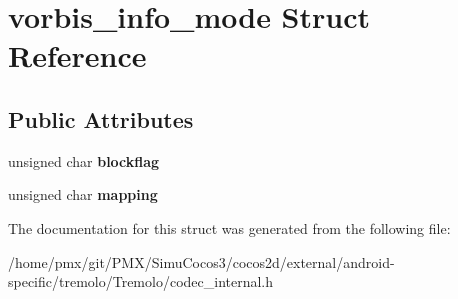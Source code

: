 \hypertarget{structvorbis__info__mode}{}\section{vorbis\+\_\+info\+\_\+mode Struct Reference}
\label{structvorbis__info__mode}
\subsection*{Public Attributes}
\begin{DoxyCompactItemize}
\item 
\mbox{\label{structvorbis__info__mode_a83d0bf9b2de908c64a101b4ff6e38444}} 
unsigned char {\bfseries blockflag}
\item 
\mbox{\label{structvorbis__info__mode_a8eae9822b44a01e6a142c6704131a4e8}} 
unsigned char {\bfseries mapping}
\end{DoxyCompactItemize}


The documentation for this struct was generated from the following file\+:\begin{DoxyCompactItemize}
\item 
/home/pmx/git/\+P\+M\+X/\+Simu\+Cocos3/cocos2d/external/android-\/specific/tremolo/\+Tremolo/codec\+\_\+internal.\+h\end{DoxyCompactItemize}
